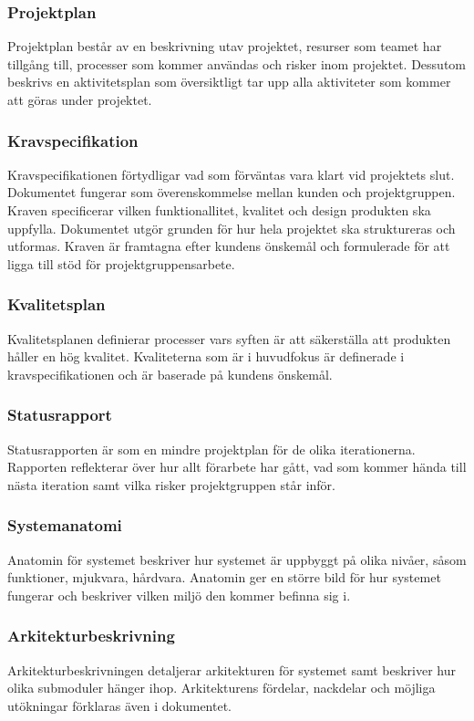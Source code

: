 \subsubsection*{Projektplan}
Projektplan består av en beskrivning utav projektet, 
resurser som teamet har tillgång till, processer som kommer användas och risker inom projektet.
Dessutom beskrivs en aktivitetsplan som översiktligt tar upp alla aktiviteter som kommer att
göras under projektet.

\subsubsection*{Kravspecifikation}
Kravspecifikationen förtydligar vad som förväntas vara klart vid projektets slut. Dokumentet fungerar som överenskommelse mellan kunden och projektgruppen. Kraven specificerar vilken funktionallitet, kvalitet och design produkten ska uppfylla. Dokumentet utgör grunden för hur hela projektet ska struktureras och utformas. Kraven är framtagna efter kundens önskemål och formulerade för att ligga till stöd för projektgruppensarbete.

\subsubsection*{Kvalitetsplan}
Kvalitetsplanen definierar processer vars syften är att säkerställa att produkten håller en hög kvalitet. Kvaliteterna som är i huvudfokus är definerade i kravspecifikationen och är baserade på kundens önskemål.

\subsubsection*{Statusrapport}
Statusrapporten är som en mindre projektplan för
de olika iterationerna. Rapporten reflekterar över hur allt förarbete har gått, vad som kommer
hända till nästa iteration samt vilka risker projektgruppen står inför.

\subsubsection*{Systemanatomi}
Anatomin för systemet beskriver hur systemet är uppbyggt på olika nivåer, såsom funktioner, 
mjukvara, hårdvara. Anatomin ger en större bild för hur systemet fungerar och beskriver vilken miljö den kommer
befinna sig i.

\subsubsection*{Arkitekturbeskrivning}
Arkitekturbeskrivningen detaljerar arkitekturen för systemet samt beskriver hur olika submoduler hänger ihop. Arkitekturens fördelar, nackdelar och möjliga utökningar förklaras även i dokumentet.

